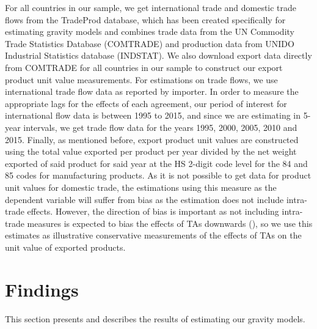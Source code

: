 For all countries in our sample, we get international trade and domestic
trade flows from the TradeProd database, which has been created
specifically for estimating gravity models and combines trade data from
the UN Commodity Trade Statistics Database (COMTRADE) and production
data from UNIDO Industrial Statistics database (INDSTAT). We also
download export data directly from COMTRADE for all countries in our
sample to construct our export product unit value measurements. For
estimations on trade flows, we use international trade flow data as
reported by importer. In order to measure the appropriate lags for the
effects of each agreement, our period of interest for international flow
data is between 1995 to 2015, and since we are estimating in 5-year
intervals, we get trade flow data for the years 1995, 2000, 2005, 2010
and 2015. Finally, as mentioned before, export product unit values are
constructed using the total value exported per product per year divided
by the net weight exported of said product for said year at the HS
2-digit code level for the 84 and 85 codes for manufacturing products.
As it is not possible to get data for product unit values for domestic
trade, the estimations using this measure as the dependent variable will
suffer from bias as the estimation does not include intra-trade effects.
However, the direction of bias is important as not including intra-trade
measures is expected to bias the effects of TAs downwards (\cite{yotov_advanced_2016}), so we use this estimates as illustrative conservative
measurements of the effects of TAs on the unit value of exported
products.

%
\section{Findings}%
\label{sec:Findings}%
This section presents and describes the results of estimating our gravity models.

%
